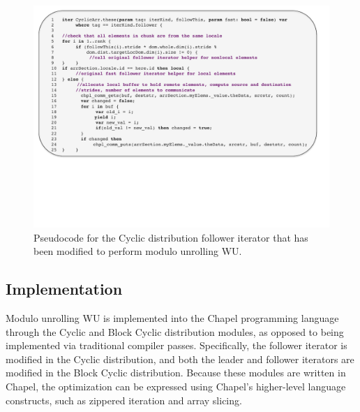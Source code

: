 \begin{figure}
\begin{center}
\includegraphics[scale=0.40]{./Figures/cyclic_muwu_follower}
\caption{Pseudocode for the Cyclic distribution follower iterator that has been modified to perform modulo unrolling WU. }
\label{cyclic_muwu_follower}
\end{center}
\end{figure}

\subsection{Implementation}\label{subsec:cyclic_modulo}

Modulo unrolling WU is implemented into the Chapel programming language through the Cyclic and Block Cyclic distribution modules, as opposed to being implemented via traditional compiler passes. Specifically, the follower iterator is modified in the Cyclic distribution, and both the leader and follower iterators are modified in the Block Cyclic distribution. Because these modules are written in Chapel, the optimization can be expressed using Chapel's higher-level language constructs, such as zippered iteration and array slicing. 

